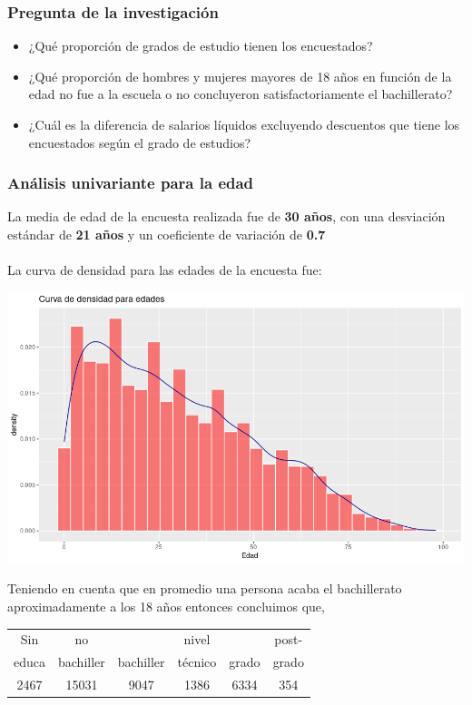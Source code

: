 \begin{multicols}{2}

\subsubsection*{Pregunta de la investigación}
\begin{center}
    \begin{itemize}
	\item ¿Qué proporción de grados de estudio tienen los encuestados?
	\item ¿Qué proporción de hombres y mujeres mayores de 18 años en función de la edad no fue a la escuela o no concluyeron satisfactoriamente el bachillerato?
	\item ¿Cuál es la diferencia de salarios líquidos excluyendo descuentos que tiene los encuestados según el grado de estudios?
    \end{itemize}
\end{center}

\subsubsection*{Análisis univariante para la edad}
La media de edad de la encuesta realizada fue de \textbf{30 años}, con una desviación estándar de \textbf{21 años} y un coeficiente de variación de \textbf{0.7}\\\\
La curva de densidad para las edades de la encuesta fue:
\begin{center}
    \includegraphics[scale = 0.32]{codigoFuente/tareas/estadistica/imagenes/densidad_edad.png}
\end{center}
Teniendo en cuenta que en promedio una persona acaba el bachillerato  aproximadamente a los 18 años entonces concluimos que, 
\begin{center}
    \begin{tabular}{|c|c|c|c|c|c|}
	\hline
	Sin&no&&nivel&&post-\\
		     educa&bachiller&bachiller&técnico&grado&grado\\
		     \hline
			  2467&15031&9047&1386&6334&354\\
			  \hline
    \end{tabular}
\end{center}


\end{multicols}

